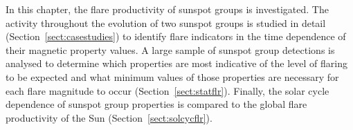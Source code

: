 {In this chapter, the flare productivity of sunspot groups is investigated. The activity throughout the evolution of two sunspot groups is studied in detail (Section~\ref{sect:casestudies}) to identify flare indicators in the time dependence of their magnetic property values. A large sample of sunspot group detections is analysed to determine which properties are most indicative of the level of flaring to be expected and what minimum values of those properties are necessary for each flare magnitude to occur (Section~\ref{sect:statflr}). Finally, the solar cycle dependence of sunspot group properties is compared to the global flare productivity of the Sun (Section~\ref{sect:solcycflr}).
                                                                                                                                                                                                                                                                                                                                                                                                                                                                                                                                                                                                                                                                                                                                                                                                                                                                                                                                                                                                                                                                                                                                                                                                                                                                                                                                                                                                                                                                                                                                                                                                                                                                                                                                                                                                                                                                                                                                                                                                                                                                                                                                                                                                                                                                                                                                                                                                                                                                                                                                                                                                                                                                                                                                                 }
